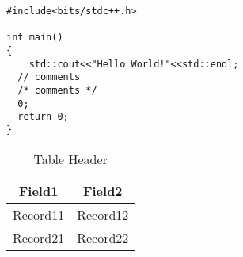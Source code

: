 \documentclass[lang=en,9pt,a4paper,cite=authoryear]{lewisthesis}
\newcommand{\lil}[1]{\lstinline{#1}}
\begin{document}
\begin{multicols}{2}
\begin{lstlisting}[style=lstycxx,caption={\lil{C/C++} Source Code}]
#include<bits/stdc++.h>

int main()
{
	std::cout<<"Hello World!"<<std::endl;
  // comments
  /* comments */
  0;
  return 0;
}
\end{lstlisting}
\end{multicols}

\begin{table}[H]
\centering
\caption{Table Header}
\begin{tabular}{cc}
\hline
Field1 & Field2 \\
\hline
Record11 & Record12 \\
Record21 & Record22 \\
\hline
\end{tabular}
\end{table}
\end{document}
